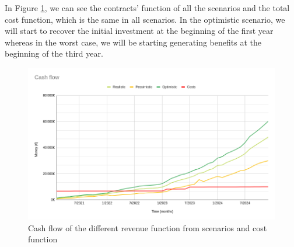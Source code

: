 In Figure \ref{fig:cashflow}, we can see the contracts’ function of all the scenarios and the total cost function, which is the same in all scenarios. In the optimistic scenario, we will start to recover the initial investment at the beginning of the first year whereas in the worst case, we will be starting generating benefits at the beginning of the third year.
\begin{figure}
	\centering
	\includegraphics[width=15cm]{CashFlow.png}
	\caption{Cash flow of the different revenue function from scenarios and cost function}
	\label{fig:cashflow}
\end{figure}
